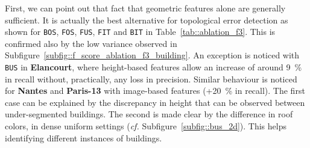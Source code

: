             \begin{figure}[htpb]
                \centering
            \end{figure}

            First, we can point out that fact that geometric features alone are generally sufficient.
            It is actually the best alternative for topological error detection as shown for \texttt{BOS}, \texttt{FOS}, \texttt{FUS}, \texttt{FIT} and \texttt{BIT} in Table~\ref{tab::ablation_f3}.
            This is confirmed also by the low variance observed in Subfigure~\ref{subfig::f_score_ablation_f3_building}.
            An exception is noticed with \texttt{BUS} in \textbf{Elancourt}, where height-based features allow an increase of around \SI{9}{\percent} in recall without, practically, any loss in precision.
            Similar behaviour is noticed for \textbf{Nantes} and \textbf{Paris-13} with image-based features (+\SI{20}{\percent} in recall).
            The first case can be explained by the discrepancy in height that can be observed between under-segmented buildings.
            The second is made clear by the difference in roof colors, in dense uniform settings (\textit{cf.} Subfigure~\ref{subfig::bus_2d}).
            This helps identifying different instances of buildings.\\

